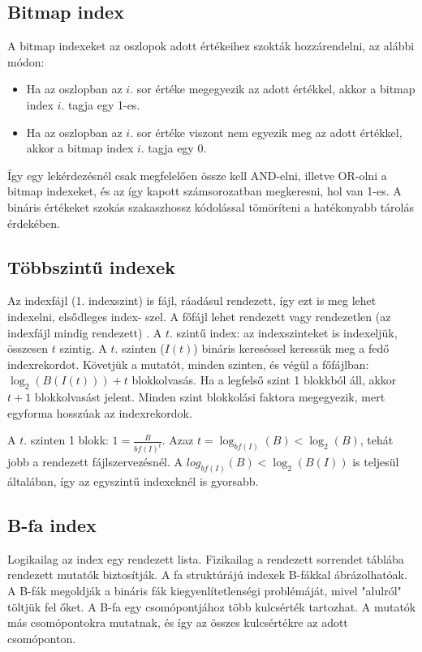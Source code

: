 \documentclass[margin=0px]{article}
\begin{document}
\subsection{Bitmap index}

A bitmap indexeket az oszlopok adott értékeihez szokták hozzárendelni, az alábbi módon:
\begin{itemize}
    \item	Ha az oszlopban az $i$. sor értéke megegyezik az adott értékkel, akkor a bitmap index $i$. tagja
          egy 1-es.

    \item	Ha az oszlopban az $i$. sor értéke viszont nem egyezik meg az adott értékkel, akkor a bitmap
          index $i$. tagja egy 0.
\end{itemize}

Így egy lekérdezésnél csak megfelelően össze kell AND-elni, illetve OR-olni a bitmap indexeket, és az
így kapott számsorozatban megkeresni, hol van 1-es.
A bináris értékeket szokás szakaszhossz kódolással tömöríteni a hatékonyabb tárolás érdekében.

\subsection{Többszintű indexek}

Az indexfájl (1. indexszint) is fájl, ráadásul rendezett, így ezt is meg lehet indexelni, elsődleges index-
szel. A főfájl lehet rendezett vagy rendezetlen (az indexfájl mindig rendezett) . A $t$. szintű index: az
indexszinteket is indexeljük, összesen $t$ szintig.
A $t$. szinten ($I(t)$)  bináris kereséssel keressük meg a fedő indexrekordot. Követjük a mutatót, minden
szinten, és végül a főfájlban: $\log_{2}(B(I(t))) + t$ blokkolvasás. Ha a legfelső szint 1 blokkból áll, akkor $t+1$
blokkolvasást jelent. Minden szint blokkolási faktora megegyezik, mert egyforma hosszúak az
indexrekordok.

A $t$. szinten 1 blokk: $1=\frac{B}{bf(I)^{t}}$. Azaz $t=\log_{bf(I)}(B) < \log_{2}(B) $, tehát jobb a rendezett fájlszervezésnél. A
$log_{bf(I)}(B) < \log_{2}(B(I)) $ is teljesül általában, így az egyszintű indexeknél is
gyorsabb.

\subsection{B-fa index}

Logikailag az index egy rendezett lista. Fizikailag a rendezett sorrendet táblába rendezett mutatók
biztosítják. A fa struktúrájú indexek B-fákkal ábrázolhatóak. A B-fák megoldják a bináris fák
kiegyenlítetlenségi problémáját, mivel "alulról" töltjük fel őket. A B-fa egy csomópontjához több
kulcsérték tartozhat. A mutatók más csomópontokra mutatnak, és így az összes kulcsértékre az adott
csomóponton.
\end{document}
